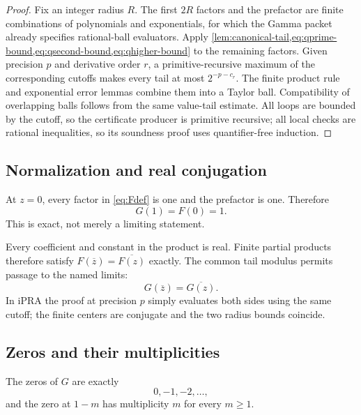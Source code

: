 \begin{proof}
Fix an integer radius \(R\).  The first \(2R\) factors and the prefactor are
finite combinations of polynomials and exponentials, for which the Gamma packet
already specifies rational-ball evaluators.  Apply
\cref{lem:canonical-tail,eq:qprime-bound,eq:qsecond-bound,eq:qhigher-bound} to
the remaining factors.  Given precision \(p\) and derivative order \(r\), a
primitive-recursive maximum of the corresponding cutoffs makes every tail at
most \(2^{-p-c_r}\).  The finite product rule and exponential error lemmas
combine them into a Taylor ball.  Compatibility of overlapping balls follows
from the same value-tail estimate.  All loops are bounded by the cutoff, so the
certificate producer is primitive recursive; all local checks are rational
inequalities, so its soundness proof uses quantifier-free induction.
\end{proof}

\subsection{Normalization and real conjugation}

At \(z=0\), every factor in \cref{eq:Fdef} is one and the prefactor is one.
Therefore
\begin{equation}\label{eq:G1}
 G(1)=F(0)=1.
\end{equation}
This is exact, not merely a limiting statement.

Every coefficient and constant in the product is real.  Finite partial products
therefore satisfy
\(
F(\overline z)=\overline{F(z)}
\)
exactly.  The common tail modulus permits passage to the named limits:
\begin{equation}\label{eq:conj}
 G(\overline z)=\overline{G(z)}.
\end{equation}
In iPRA the proof at precision \(p\) simply evaluates both sides using the same
cutoff; the finite centers are conjugate and the two radius bounds coincide.

\subsection{Zeros and their multiplicities}

\begin{theorem}\label{thm:zeros}
The zeros of \(G\) are exactly
\[
 0,-1,-2,\ldots,
\]
and the zero at \(1-m\) has multiplicity \(m\) for every \(m\ge1\).
\end{theorem}

